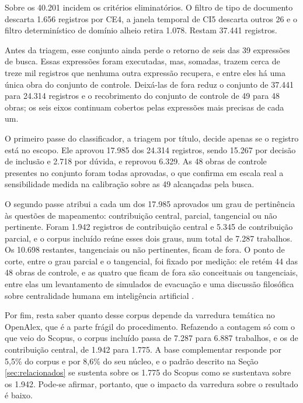 Sobre os 40.201 incidem os critérios eliminatórios. O filtro de tipo de documento descarta 1.656 registros por CE4, a janela temporal de CI5 descarta outros 26 e o filtro determinístico de domínio alheio retira 1.078. Restam 37.441 registros.

Antes da triagem, esse conjunto ainda perde o retorno de seis das 39 expressões de busca. Essas expressões foram executadas, mas, somadas, trazem cerca de treze mil registros que nenhuma outra expressão recupera, e entre eles há uma única obra do conjunto de controle. Deixá-las de fora reduz o conjunto de 37.441 para 24.314 registros e o recobrimento do conjunto de controle de 49 para 48 obras; os seis eixos continuam cobertos pelas expressões mais precisas de cada um.

O primeiro passe do classificador, a triagem por título, decide apenas se o registro está no escopo. Ele aprovou 17.985 dos 24.314 registros, sendo 15.267 por decisão de inclusão e 2.718 por dúvida, e reprovou 6.329. As 48 obras de controle presentes no conjunto foram todas aprovadas, o que confirma em escala real a sensibilidade medida na calibração sobre as 49 alcançadas pela busca.

O segundo passe atribui a cada um dos 17.985 aprovados um grau de pertinência às questões de mapeamento: contribuição central, parcial, tangencial ou não pertinente. Foram 1.942 registros de contribuição central e 5.345 de contribuição parcial, e o corpus incluído reúne esses dois graus, num total de 7.287 trabalhos. Os 10.698 restantes, tangenciais ou não pertinentes, ficam de fora. O ponto de corte, entre o grau parcial e o tangencial, foi fixado por medição: ele retém 44 das 48 obras de controle, e as quatro que ficam de fora são conceituais ou tangenciais, entre elas um levantamento de simulados de evacuação e uma discussão filosófica sobre centralidade humana em inteligência artificial \cite{taylor2023human}.

Por fim, resta saber quanto desse corpus depende da varredura temática no OpenAlex, que é a parte frágil do procedimento. Refazendo a contagem só com o que veio do Scopus, o corpus incluído passa de 7.287 para 6.887 trabalhos, e os de contribuição central, de 1.942 para 1.775. A base complementar responde por 5,5\% do corpus e por 8,6\% do seu núcleo, e o padrão descrito na Seção \ref{sec:relacionados} se sustenta sobre os 1.775 do Scopus como se sustentava sobre os 1.942. Pode-se afirmar, portanto, que o impacto da varredura sobre o resultado é baixo.

